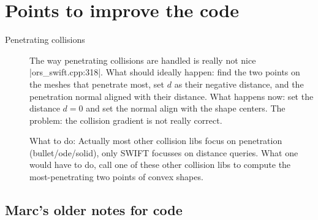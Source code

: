 \section{Points to improve the code}

\begin{description}
\item[Penetrating collisions] The way penetrating collisions are
handled is really not nice |ors_swift.cpp:318|. What should ideally
happen: find the two points on the meshes that penetrate most, set $d$
as their negative distance, and the penetration normal aligned with
their distance. What happens now: set the distance $d=0$ and set the
normal align with the shape centers. The problem: the collision
gradient is not really correct.

What to do: Actually most other collision libs focus on penetration
(bullet/ode/solid), only SWIFT focusses on distance queries. What one
would have to do, call one of these other collision libs to compute
the most-penetrating two points of convex shapes.


\end{description}

\subsection{Marc's older notes for code}


